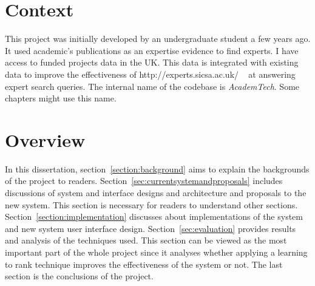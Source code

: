 \section{Context}
This project was initially developed by an undergraduate student a few years ago. It used academic's publications as an expertise evidence to find experts.
I have access to funded projects data in the UK. This data is integrated with existing data to improve the effectiveness of http://experts.sicsa.ac.uk/ ~\cite{sicsasearch}
at answering expert search queries. The internal name of the codebase is \textit{AcademTech}. Some chapters might use this name.

\section{Overview}
In this dissertation, section~\ref{section:background} aims to explain the backgrounds of the project to readers. 
Section~\ref{sec:currentsystemandproposals} includes discussions of system and interface designs and architecture and proposals to the new system.
This section is necessary for readers to understand other sections. 
Section~\ref{section:implementation} discusses about implementations of the system and new system user interface design. 
Section~\ref{sec:evaluation} provides results and analysis of the techniques used. 
This section can be viewed as the most important part of the whole project since it 
analyses whether applying a learning to rank technique improves the effectiveness of the system or not. 
The last section is the conclusions of the project.
